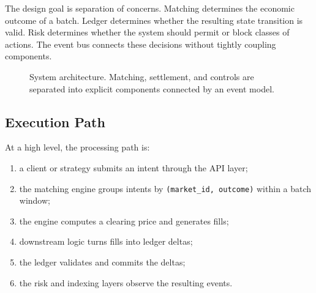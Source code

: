 \documentclass[11pt]{article}
\begin{document}
The design goal is separation of concerns. Matching determines the economic outcome of a batch. Ledger determines whether the resulting state transition is valid. Risk determines whether the system should permit or block classes of actions. The event bus connects these decisions without tightly coupling components.

\begin{figure}[ht]
  \centering
  \caption{System architecture. Matching, settlement, and controls are separated into explicit components connected by an event model.}
  \label{fig:architecture}
\end{figure}

\subsection{Execution Path}

At a high level, the processing path is:

\begin{enumerate}[leftmargin=1.5em]
  \item a client or strategy submits an intent through the API layer;
  \item the matching engine groups intents by \texttt{(market\_id, outcome)} within a batch window;
  \item the engine computes a clearing price and generates fills;
  \item downstream logic turns fills into ledger deltas;
  \item the ledger validates and commits the deltas;
  \item the risk and indexing layers observe the resulting events.
\end{enumerate}
\end{document}
